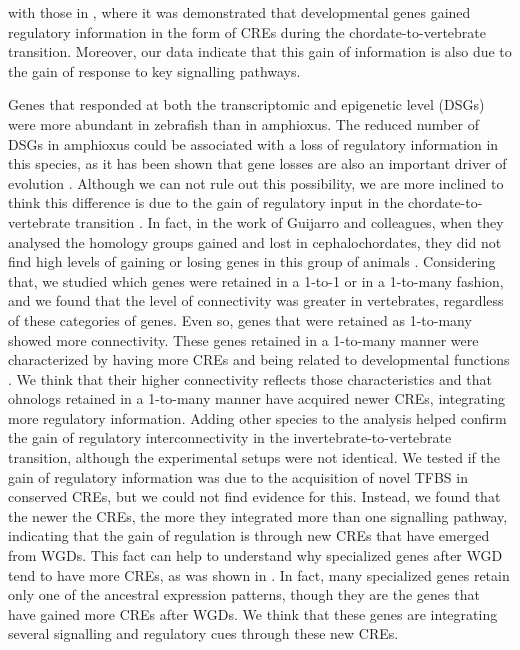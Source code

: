 with those in \parencite{marletaz_amphioxus_2018}, where it was demonstrated that developmental genes gained regulatory information in the form of CREs during the chordate-to-vertebrate transition. Moreover, our data indicate that this gain of information is also due to the gain of response to key signalling pathways.


Genes that responded at both the transcriptomic and epigenetic level (DSGs) were more abundant in zebrafish than in amphioxus. The reduced number of DSGs in amphioxus could be associated with a loss of regulatory information in this species, as it has been shown that gene losses are also an important driver of evolution \parencite{guijarro-clarke_widespread_2020}. Although we can not rule out this possibility, we are more inclined to think this difference is due to the gain of regulatory input in the chordate-to-vertebrate transition \parencite{marletaz_amphioxus_2018}. In fact, in the work of Guijarro and colleagues, when they analysed the homology groups gained and lost in cephalochordates, they did not find high levels of gaining or losing genes in this group of animals \parencite{guijarro-clarke_widespread_2020}. Considering that, we studied which genes were retained in a 1-to-1 or in a 1-to-many fashion, and we found that the level of connectivity was greater in vertebrates, regardless of these categories of genes. Even so, genes that were retained as 1-to-many showed more connectivity. These genes retained in a 1-to-many manner were characterized by having more CREs and being related to developmental functions \parencite{marletaz_amphioxus_2018}. We think that their higher connectivity reflects those characteristics and that ohnologs retained in a 1-to-many manner have acquired newer CREs, integrating more regulatory information. Adding other species to the analysis helped confirm the gain of regulatory interconnectivity in the invertebrate-to-vertebrate transition, although the experimental setups were not identical. We tested if the gain of regulatory information was due to the acquisition of novel TFBS in conserved CREs, but we could not find evidence for this. Instead, we found that the newer the CREs, the more they integrated more than one signalling pathway, indicating that the gain of regulation is through new CREs that have emerged from WGDs. This fact can help to understand why specialized genes after WGD tend to have more CREs, as was shown in \parencite{marletaz_amphioxus_2018}. In fact, many specialized genes retain only one of the ancestral expression patterns, though they are the genes that have gained more CREs after WGDs. We think that these genes are integrating several signalling and regulatory cues through these new CREs.


